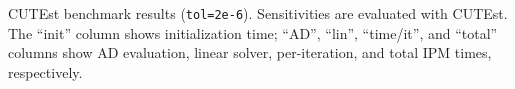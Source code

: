 \begin{table}[!ht]
  \centering
  \resizebox{\textwidth}{!}{
    
  }
  \caption{CUTEst benchmark results ({\tt tol=2e-6}). Sensitivities are
    evaluated with CUTEst. The ``init'' column shows initialization time;
    ``AD'', ``lin'', ``time/it'', and ``total'' columns show AD evaluation,
    linear solver, per-iteration, and total IPM times, respectively.
  \label{tab:cutest:benchmark}}
\end{table}




